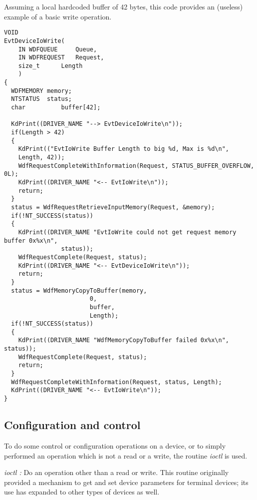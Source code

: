 \documentclass[11pt]{report}
\begin{document}
Assuming a local hardcoded buffer of 42 bytes, this code provides
an (useless) example of a basic write operation.
\begin{lstlisting}
VOID 
EvtDeviceIoWrite(
    IN WDFQUEUE		Queue,
    IN WDFREQUEST	Request,
    size_t		Length
    )
{
  WDFMEMORY	memory;
  NTSTATUS	status;
  char          buffer[42];

  KdPrint((DRIVER_NAME "--> EvtDeviceIoWrite\n"));
  if(Length > 42)
  {
    KdPrint(("EvtIoWrite Buffer Length to big %d, Max is %d\n",
    Length, 42));
    WdfRequestCompleteWithInformation(Request, STATUS_BUFFER_OVERFLOW, 0L);
    KdPrint((DRIVER_NAME "<-- EvtIoWrite\n"));
    return;
  }
  status = WdfRequestRetrieveInputMemory(Request, &memory);
  if(!NT_SUCCESS(status))
  {
    KdPrint((DRIVER_NAME "EvtIoWrite could not get request memory buffer 0x%x\n",
                status));
    WdfRequestComplete(Request, status);
    KdPrint((DRIVER_NAME "<-- EvtDeviceIoWrite\n"));
    return;
  }
  status = WdfMemoryCopyToBuffer(memory,
                        0,
                        buffer,
                        Length);
  if(!NT_SUCCESS(status))
  {
    KdPrint((DRIVER_NAME "WdfMemoryCopyToBuffer failed 0x%x\n", status));
    WdfRequestComplete(Request, status);
    return;
  }
  WdfRequestCompleteWithInformation(Request, status, Length);
  KdPrint((DRIVER_NAME "<-- EvtIoWrite\n"));
}
\end{lstlisting}


\subsection{Configuration and control}
To do some control or configuration operations on a device, or to simply performed
an operation which is not a read or a write, the routine {\it ioctl} is used.

{\it ioctl :} Do an operation other than a read or write. This routine originally
provided a mechanism to get and set device parameters for terminal devices;
its use has expanded to other types of devices as well.
\end{document}
